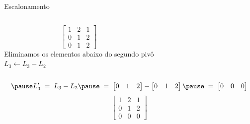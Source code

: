 \begin{resolution}{Escalonamento}
\begin{columns}
  \[
  \begin{bmatrix}
    1 & 2 & 1 \\
    0 & 1 & 2 \\
    0 & 1 & 2
  \end{bmatrix}
  \]
  \pause
{}
  Eliminamos os elementos abaixo do segundo pivô
  \\ \pause
  \(
    L_3 \leftarrow L_3 - L_2
  \)
\end{columns}
\vspace{-\baselineskip}
\[
  \pause
  L'_3
  \;=\;
  L_3 - L_2
  \pause
  \;=\;
  \begin{bmatrix}
    0 & 1 & 2
  \end{bmatrix}
  -
  \begin{bmatrix}
    0 & 1 & 2
  \end{bmatrix}
  \pause
  \;=\;
  \begin{bmatrix}
    0 & 0 & 0
  \end{bmatrix}
\]
\pause
\[
\begin{bmatrix}
  1 & 2 & 1 \\
  0 & 1 & 2 \\
  0 & 0 & 0
\end{bmatrix}
\]
\end{resolution}

